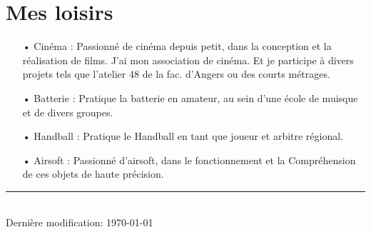 \documentclass[french]{article}
\begin{document}
\section*{Mes loisirs}
\begin{itemize}
	\item[• Cinéma :] Passionné de cinéma depuis petit, dans la conception et la réalisation de films. J'ai mon association de cinéma. Et je participe à divers projets tels que l’atelier 48 de la fac. d’Angers ou des courts métrages.
	
	\item[• Batterie :] Pratique la batterie en amateur, au sein d'une école de muisque et de divers groupes.

	\item[• Handball :] Pratique le Handball en tant que joueur et arbitre régional.

	\item[• Airsoft :] Passionné d'airsoft, dans le fonctionnement et la Compréhension de ces objets de haute précision.

\end{itemize}

\centering
\rule{0.25\linewidth}{0.4pt}\\
\medskip
Dernière modification: \today
\end{document}
